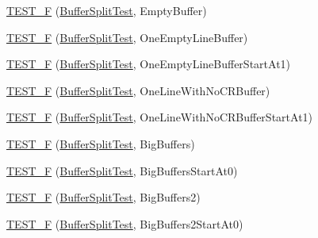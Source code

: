 \begin{DoxyCompactItemize}
\item 
\hyperlink{namespaceclang_1_1tidy_1_1pagesjaunes_1_1test_ad2c5a5690cd7d1cada077f8555327570}{T\+E\+S\+T\+\_\+F} (\hyperlink{classclang_1_1tidy_1_1pagesjaunes_1_1test_1_1_buffer_split_test}{Buffer\+Split\+Test}, Empty\+Buffer)
\item 
\hyperlink{namespaceclang_1_1tidy_1_1pagesjaunes_1_1test_ae780e29f506c788f65df42a334447da4}{T\+E\+S\+T\+\_\+F} (\hyperlink{classclang_1_1tidy_1_1pagesjaunes_1_1test_1_1_buffer_split_test}{Buffer\+Split\+Test}, One\+Empty\+Line\+Buffer)
\item 
\hyperlink{namespaceclang_1_1tidy_1_1pagesjaunes_1_1test_adb93e03e4a6b2fa98585f02022bf570f}{T\+E\+S\+T\+\_\+F} (\hyperlink{classclang_1_1tidy_1_1pagesjaunes_1_1test_1_1_buffer_split_test}{Buffer\+Split\+Test}, One\+Empty\+Line\+Buffer\+Start\+At1)
\item 
\hyperlink{namespaceclang_1_1tidy_1_1pagesjaunes_1_1test_a16c0b3f2dcc4de39bf59735e18c9611c}{T\+E\+S\+T\+\_\+F} (\hyperlink{classclang_1_1tidy_1_1pagesjaunes_1_1test_1_1_buffer_split_test}{Buffer\+Split\+Test}, One\+Line\+With\+No\+C\+R\+Buffer)
\item 
\hyperlink{namespaceclang_1_1tidy_1_1pagesjaunes_1_1test_a8a4e7adcedc9e053673a69f3805513fa}{T\+E\+S\+T\+\_\+F} (\hyperlink{classclang_1_1tidy_1_1pagesjaunes_1_1test_1_1_buffer_split_test}{Buffer\+Split\+Test}, One\+Line\+With\+No\+C\+R\+Buffer\+Start\+At1)
\item 
\hyperlink{namespaceclang_1_1tidy_1_1pagesjaunes_1_1test_a35ad2a928b471ce291df19fb21480d8e}{T\+E\+S\+T\+\_\+F} (\hyperlink{classclang_1_1tidy_1_1pagesjaunes_1_1test_1_1_buffer_split_test}{Buffer\+Split\+Test}, Big\+Buffers)
\item 
\hyperlink{namespaceclang_1_1tidy_1_1pagesjaunes_1_1test_af3a20a024177569efd2b45f21e207966}{T\+E\+S\+T\+\_\+F} (\hyperlink{classclang_1_1tidy_1_1pagesjaunes_1_1test_1_1_buffer_split_test}{Buffer\+Split\+Test}, Big\+Buffers\+Start\+At0)
\item 
\hyperlink{namespaceclang_1_1tidy_1_1pagesjaunes_1_1test_a165e5998fefd397abdb120da57c0ff98}{T\+E\+S\+T\+\_\+F} (\hyperlink{classclang_1_1tidy_1_1pagesjaunes_1_1test_1_1_buffer_split_test}{Buffer\+Split\+Test}, Big\+Buffers2)
\item 
\hyperlink{namespaceclang_1_1tidy_1_1pagesjaunes_1_1test_abdaff4f1b90a3db57f59ba18a26451a6}{T\+E\+S\+T\+\_\+F} (\hyperlink{classclang_1_1tidy_1_1pagesjaunes_1_1test_1_1_buffer_split_test}{Buffer\+Split\+Test}, Big\+Buffers2\+Start\+At0)
\item 

\end{DoxyCompactItemize}

